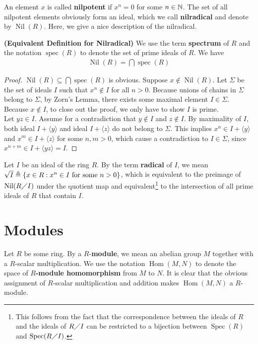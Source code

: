 \documentclass{report}
\begin{document}
An element $x$ is called \textbf{nilpotent} if $x^n=0$ for some  $n\in\mathbb{N}$. The set of all nilpotent elements obviously form an ideal, which we call \textbf{nilradical} and denote by $\operatorname{Nil}(R)$. Here, we give a nice description of the nilradical. 
\begin{theorem}
\textbf{(Equivalent Definition for Nilradical)} We use the term \textbf{spectrum} of $R$ and the notation  $\operatorname{spec}(R)$ to denote the set of prime ideals of $R$. We have 
 \begin{align*}
\operatorname{Nil}(R)=\bigcap \operatorname{spec}(R)
\end{align*}
\end{theorem}
\begin{proof}
$\operatorname{Nil}(R)\subseteq \bigcap \operatorname{spec}(R)$ is obvious. Suppose $x \not\in \operatorname{Nil}(R)$. Let $\Sigma$ be the set of ideals $I$ such that $x^n\not\in I$ for all $n>0$. Because unions of chains in $\Sigma$ belong to $\Sigma$, by Zorn's Lemma, there exists some maximal element $I \in \Sigma$. Because $x\not \in I$, to close out the proof, we only have to show $I$ is prime.\\

Let $yz \in I$. Assume for a contradiction that $y\not\in I$ and $z\not\in I$. By maximality of $I$, both ideal $I+ \langle y\rangle$ and ideal $I+\langle z\rangle$ do not belong to $\Sigma$. This implies $x^n \in I+ \langle y\rangle$ and $x^m \in I + \langle z\rangle $ for some $n,m>0$, which cause a contradiction to $I \in \Sigma$, since $x^{n+m} \in I + \langle yz\rangle =I$. 
\end{proof}

Let $I$ be an ideal of the ring $R$. By the term \textbf{radical} of $I$, we mean $\sqrt{I}\triangleq \{  x \in R : x^n \in I \text{ for some } n > 0  \}$, which is equivalent to  the preimage of $\operatorname{Nil}(R \diagup  I)$ under the quotient map and equivalent\footnote{This follows from the fact that the correspondence between the ideals of $R$ and the ideals of $R \diagup  I$ can be restricted to a bijection between $\operatorname{Spec}(R)$ and $\operatorname{Spec}(R \diagup  I)$.} to the intersection of all prime ideals of $R$ that contain $I$.
\section{Modules}
Let $R$ be some ring. By a $R$-\textbf{module}, we mean an abelian group $M$ together with a $R$-scalar multiplication. We use the notation $\operatorname{Hom}(M,N)$ to denote the space of \textbf{$R$-module homomorphism} from  $M$ to $N$. It is clear that the obvious assignment of $R$-scalar multiplication and addition makes $\operatorname{Hom}(M,N)$ a $R$-module.\\
\end{document}
